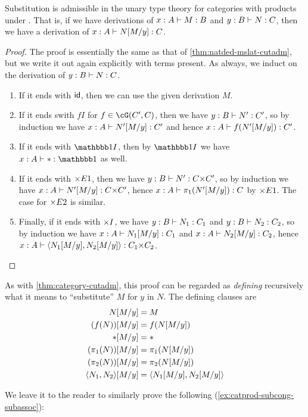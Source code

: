 \begin{thm}\label{thm:catprod-subadm}
  Substitution is admissible in the unary type theory for categories with products under \cG.
  That is, if we have derivations of $x:A\vdash M:B$ and $y:B \vdash N:C$, then we have a derivation of $x:A \vdash N[M/y]:C$.
\end{thm}
\begin{proof}
  The proof is essentially the same as that of \cref{thm:natded-mslat-cutadm}, but we write it out again explicitly with terms present.
  As always, we induct on the derivation of $y:B \vdash N:C$.
  \begin{enumerate}
  \item If it ends with $\mathsf{id}$, then we can use the given derivation $M$.
  \item If it ends swith $fI$ for $f\in \cG(C',C)$, then we have $y:B \vdash N':C'$, so by induction we have $x:A\vdash N'[M/y]:C'$ and hence $x:A\vdash f(N'[M/y]):C'$.
  \item If it ends with $\unit I$, then by $\unit I$ we have $x:A \types \ttt:\unit$ as well.
  \item If it ends with $\timesE1$, then we have $y:B\types N':C\times C'$, so by induction we have $x:A \types N'[M/y]:C\times C'$, hence $x:A \vdash \pi_1(N'[M/y]):C$ by $\timesE1$.
    The case for $\timesE2$ is similar.
  \item Finally, if it ends with $\timesI$, we have $y:B\vdash N_1:C_1$ and $y:B\vdash N_2:C_2$, so by induction we have $x:A \vdash N_1[M/y]:C_1$ and $x:A \vdash N_2[M/y]:C_2$, hence $x:A \types \pair{N_1[M/y]}{N_2[M/y]}:C_1\times C_2$.\qedhere
  \end{enumerate}
\end{proof}

As with \cref{thm:category-cutadm}, this proof can be regarded as \emph{defining} recursively what it means to ``substitute'' $M$ for $y$ in $N$.
The defining clauses are
\begin{align*}
  N[M/y] &= M\\
  (f(N))[M/y] &= f(N[M/y])\\
  \mathord{\ast}[M/y] &= \mathord{\ast}\\
  (\pi_1(N))[M/y] &= \pi_1(N[M/y])\\
  (\pi_2(N))[M/y] &= \pi_2(N[M/y])\\
  \langle N_1,N_2\rangle[M/y] &= \langle N_1[M/y],N_2[M/y]\rangle
\end{align*}

We leave it to the reader to similarly prove the following (\cref{ex:catprod-subcong-subassoc}):

